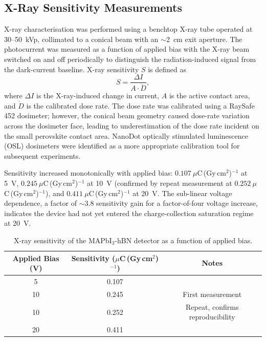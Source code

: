 \subsection{X-Ray Sensitivity Measurements}
\label{sec:mapbi_sensitivity}

X-ray characterisation was performed using a benchtop X-ray tube
operated at 30--50~kVp, collimated to a conical beam with an
$\sim$2~cm exit aperture.  The photocurrent was measured as a
function of applied bias with the X-ray beam switched on and off
periodically to distinguish the radiation-induced signal from the
dark-current baseline.  X-ray sensitivity $S$ is defined as
\begin{equation}
  S = \frac{\Delta I}{A \cdot \dot{D}},
  \label{eq:sensitivity}
\end{equation}
where $\Delta I$ is the X-ray-induced change in current, $A$ is
the active contact area, and $\dot{D}$ is the calibrated dose
rate.  The dose rate was calibrated using a RaySafe 452 dosimeter;
however, the conical beam geometry caused dose-rate variation
across the dosimeter face, leading to underestimation of the dose
rate incident on the small perovskite contact area.  NanoDot
optically stimulated luminescence (OSL) dosimeters were identified
as a more appropriate calibration tool for subsequent experiments.

Sensitivity increased monotonically with applied bias:
$0.107~\mu$C\,(Gy\,cm$^2$)$^{-1}$ at 5~V,
$0.245~\mu$C\,(Gy\,cm$^2$)$^{-1}$ at 10~V (confirmed by repeat
measurement at $0.252~\mu$C\,(Gy\,cm$^2$)$^{-1}$), and
$0.411~\mu$C\,(Gy\,cm$^2$)$^{-1}$ at 20~V.  The sub-linear
voltage dependence, a factor of $\sim$3.8 sensitivity gain for
a factor-of-four voltage increase, indicates the device had not
yet entered the charge-collection saturation regime at 20~V.

\begin{table}[htbp]
\centering
\caption{X-ray sensitivity of the MAPbI$_3$-hBN detector as a function of applied bias.}
\label{tab:mapbi_sensitivity}
\begin{tabular}{ccc}
\hline
Applied Bias (V) & Sensitivity ($\mu$C\,(Gy\,cm$^2$)$^{-1}$) & Notes \\
\hline
5  & 0.107 & \\
10 & 0.245 & First measurement \\
10 & 0.252 & Repeat, confirms reproducibility \\
20 & 0.411 & \\
\hline
\end{tabular}
\end{table}

